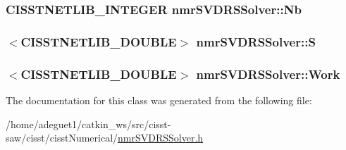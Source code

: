 \hypertarget{classnmr_s_v_d_r_s_solver_a2f397a32b6791b9eb438158f6b620cb5}{
\subsubsection[{Nb}]{\setlength{\rightskip}{0pt plus 5cm}C\-I\-S\-S\-T\-N\-E\-T\-L\-I\-B\-\_\-\-I\-N\-T\-E\-G\-E\-R nmr\-S\-V\-D\-R\-S\-Solver\-::\-Nb\hspace{0.3cm}{\ttfamily [protected]}}}\label{classnmr_s_v_d_r_s_solver_a2f397a32b6791b9eb438158f6b620cb5}
\hypertarget{classnmr_s_v_d_r_s_solver_a7ec50f8b0ef442501f1c0b866f337474}{
\subsubsection[{S}]{$<$C\-I\-S\-S\-T\-N\-E\-T\-L\-I\-B\-\_\-\-D\-O\-U\-B\-L\-E$>$ nmr\-S\-V\-D\-R\-S\-Solver\-::\-S\hspace{0.3cm}{\ttfamily [protected]}}}\label{classnmr_s_v_d_r_s_solver_a7ec50f8b0ef442501f1c0b866f337474}
\hypertarget{classnmr_s_v_d_r_s_solver_a96c3cc87d1659d99563064e240d5d087}{
\subsubsection[{Work}]{$<$C\-I\-S\-S\-T\-N\-E\-T\-L\-I\-B\-\_\-\-D\-O\-U\-B\-L\-E$>$ nmr\-S\-V\-D\-R\-S\-Solver\-::\-Work\hspace{0.3cm}{\ttfamily [protected]}}}\label{classnmr_s_v_d_r_s_solver_a96c3cc87d1659d99563064e240d5d087}


The documentation for this class was generated from the following file\-:\begin{DoxyCompactItemize}
\item 
/home/adeguet1/catkin\-\_\-ws/src/cisst-\/saw/cisst/cisst\-Numerical/\hyperlink{nmr_s_v_d_r_s_solver_8h}{nmr\-S\-V\-D\-R\-S\-Solver.\-h}\end{DoxyCompactItemize}
